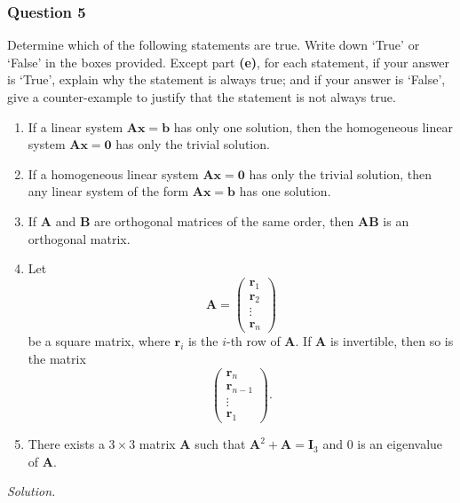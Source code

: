 \documentclass[12pt]{article}
\begin{document}
\subsubsection*{Question 5}
Determine which of the following statements are true.  Write down ‘True’ or ‘False’ in the boxes provided. Except part \textbf{(e)}, for each statement, if your answer is ‘True’, explain why the statement is always true; and if your answer is ‘False’, give a counter-example to justify that the statement is not always true.
\begin{enumerate}[label=\textbf{(\alph*)}]
\itemsep 0em
    \item If a linear system \( \mathbf{Ax}=\mathbf{b}\) has only one solution, then the homogeneous linear system \( \mathbf{Ax}=\mathbf{0} \) has only the trivial solution.
    \item If a homogeneous linear system \( \mathbf{Ax}=\mathbf{0} \) has only the trivial solution, then any linear system of the form \( \mathbf{Ax}=\mathbf{b} \) has one solution.
    \item If \( \mathbf{A} \) and \( \mathbf{B} \) are orthogonal matrices of the same order, then \( \mathbf{AB} \) is an orthogonal matrix.
    \item Let 
    \[
    \mathbf{A} = \begin{pmatrix}
    \mathbf{r}_1 \\ \mathbf{r}_2 \\ \vdots \\ \mathbf{r}_n
    \end{pmatrix}
    \]
    be a square matrix, where \( \mathbf{r}_i \) is the \( i \)-th row of \( \mathbf{A} \). If \( \mathbf{A} \) is invertible, then so is the matrix 
    \[
    \begin{pmatrix}
    \mathbf{r}_n \\ \mathbf{r}_{n-1} \\ \vdots \\ \mathbf{r}_1
    \end{pmatrix}.
    \]
    \item There exists a \( 3 \times 3 \) matrix \( \mathbf{A} \) such that \( \mathbf{A}^2 + \mathbf{A} = \mathbf{I}_3 \) and \( 0 \) is an eigenvalue of \( \mathbf{A} \). 
\end{enumerate}
\textit{Solution.}
\end{document}
